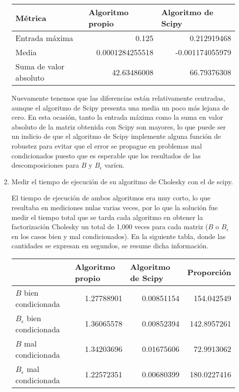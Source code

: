 \documentclass{article}
\begin{document}
\begin{enumerate}
\begin{enumerate}
    \begin{center}
        \begin{tabular}{@{}lrr@{}}
            \toprule
            Métrica                & \multicolumn{1}{l}{Algoritmo propio} & \multicolumn{1}{l}{Algoritmo de Scipy} \\ \midrule
            Entrada máxima         & 0.125                                & 0.212919468                            \\
            Media                  & 0.0001284255518                      & -0.001174055979                        \\
            Suma de valor absoluto & 42.63486008                          & 66.79376308                            \\ \bottomrule
            \end{tabular}
    \end{center}

    Nuevamente tenemos que las diferencias están relativamente centradas, aunque el algoritmo de Scipy
    presenta una media un poco más lejana de cero. En esta ocasión, tanto la entrada máxima como la suma en valor 
    absoluto de la matriz obtenida con Scipy son mayores, lo que puede ser un indicio de que el algoritmo de
    Scipy implemente alguna función de robustez para evitar que el error se propague en problemas mal condicionados
    puesto que es esperable que los resultados de las descomposiciones para $B$ y $B_\epsilon$ varíen.

    \item Medir el tiempo de ejecución de su algoritmo de Cholesky con el de scipy.
    
    El tiempo de ejecución de ambos algoritmos era muy corto, lo que resultaba en mediciones nulas
    varias veces, por lo que la solución fue medir el tiempo total que se tarda cada algoritmo en
    obtener la factorización Cholesky un total de 1,000 veces para cada matriz ($B$ o $B_\epsilon$ 
    en los casos bien y mal condicionados). En la siguiente tabla, donde las cantidades se expresan 
    en segundos, se resume dicha información.

    \begin{center}
        \begin{tabular}{@{}lrrr@{}}
            \toprule
             & \multicolumn{1}{l}{Algoritmo propio} & \multicolumn{1}{l}{Algoritmo de Scipy} & \multicolumn{1}{l}{Proporción} \\ \midrule
            $B$ bien condicionada & 1.27788901 & 0.00851154 & 154.042549 \\
            $B_\epsilon$ bien condicionada & 1.36065578 & 0.00852394 & 142.8957261 \\
            $B$ mal condicionada & 1.34203696 & 0.01675606 & 72.9913062 \\
            $B_\epsilon$ mal condicionada & 1.22572351 & 0.00680399 & 180.0227416 \\ \bottomrule
            \end{tabular}
    \end{center}
    

\end{enumerate}
\end{enumerate}
\end{document}
